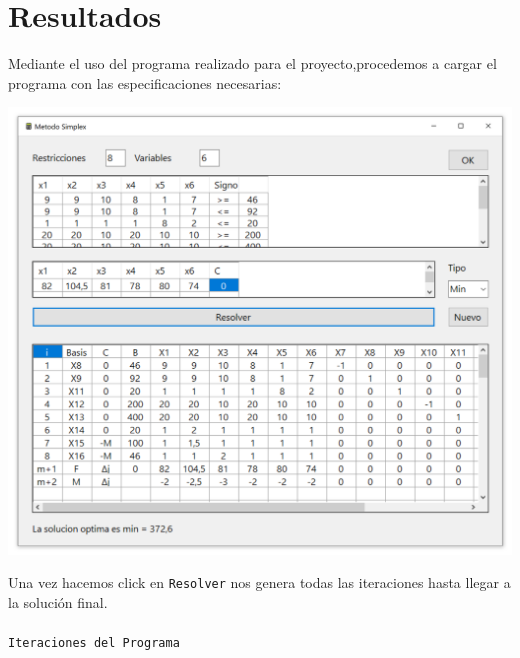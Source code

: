 \documentclass[10pt,letterpaper]{book}
\begin{document}
\section*{Resultados}
Mediante el uso del programa realizado para el proyecto,procedemos a cargar el programa con las especificaciones necesarias:
\begin{center}
\includegraphics[scale=0.55]{Programa1}
\end{center}
Una vez hacemos click en \texttt{Resolver} nos genera todas las iteraciones hasta llegar a la solución final. \\${ }$\\
\texttt{Iteraciones del Programa}
\end{document}
